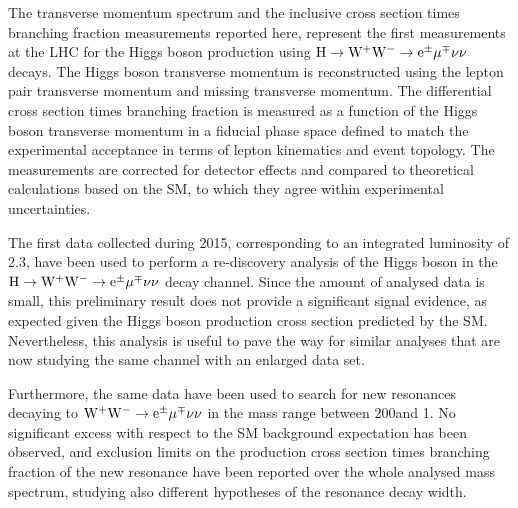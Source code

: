 The transverse momentum spectrum and the inclusive cross section times branching fraction measurements reported here, represent the first measurements at the LHC for the Higgs boson production using $\rm{H}\to\rm{W^+W^-}\to e^{\pm} \mu^{\mp}\nu\nu$ decays.
The Higgs boson transverse momentum is reconstructed using the lepton pair transverse momentum and missing transverse momentum. The differential cross section times branching fraction is measured as a function of the Higgs boson transverse momentum in a fiducial phase space defined to match the experimental acceptance in terms of lepton kinematics and event topology. The measurements are corrected for detector effects and compared to theoretical calculations based on the SM, to which they agree within experimental uncertainties.

The first data collected during 2015, corresponding to an integrated luminosity of 2.3\ifb, have been used to perform a re-discovery analysis of the Higgs boson in the $\rm{H}\to\rm{W^+W^-}\to e^{\pm} \mu^{\mp}\nu\nu$ decay channel. Since the amount of analysed data is small, this preliminary result does not provide a significant signal evidence, as expected given the Higgs boson production cross section predicted by the SM. Nevertheless, this analysis is useful to pave the way for similar analyses that are now studying the same channel with an enlarged data set.

Furthermore, the same data have been used to search for new resonances decaying to $\rm{W^+W^-}\to e^{\pm} \mu^{\mp}\nu\nu$ in the mass range between 200\GeV and 1\TeV. No significant excess with respect to the SM background expectation has been observed, and exclusion limits on the production cross section times branching fraction of the new resonance have been reported over the whole analysed mass spectrum, studying also different hypotheses of the resonance decay width.
